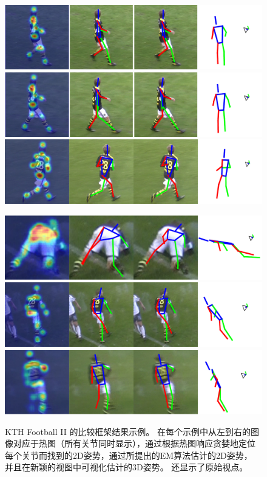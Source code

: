 \begin{figure}
  \centering
  \begin{minipage}{0.48\textwidth}
  \includegraphics[width=0.95\linewidth]{figures/examples/kth/Seq1_C1-001.pdf}
  \includegraphics[width=0.95\linewidth]{figures/examples/kth/Seq1_C1-021.pdf}
  \includegraphics[width=0.95\linewidth]{figures/examples/kth/Seq1_C1-108.pdf}
  \end{minipage}
  \hfill
  \begin{minipage}{0.48\textwidth}
  \includegraphics[width=0.95\linewidth]{figures/examples/kth/Seq2_C1-007.pdf}
  \includegraphics[width=0.95\linewidth]{figures/examples/kth/Seq2_C1-047.pdf}
  \includegraphics[width=0.95\linewidth]{figures/examples/kth/Seq2_C1-075.pdf}
  \end{minipage}
  \caption{ KTH Football II \cite{burenius20133d}的比较框架结果示例。 在每个示例中从左到右的图像对应于热图（所有关节同时显示），通过根据热图响应贪婪地定位每个关节而找到的2D姿势，通过所提出的EM算法估计的2D姿势， 并且在新颖的视图中可视化估计的3D姿势。 还显示了原始视点。}\label{fig:kth}
\end{figure}


